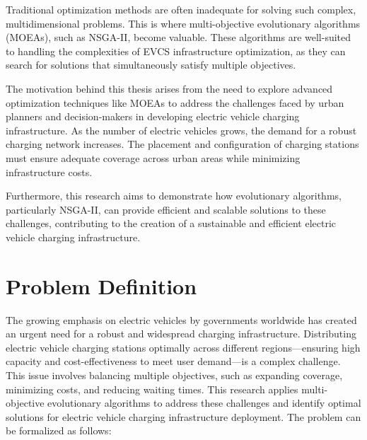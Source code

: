 Traditional optimization methods are often inadequate for solving such complex, multidimensional problems. This is where multi-objective evolutionary algorithms (MOEAs), such as NSGA-II, become valuable. These algorithms are well-suited to handling the complexities of EVCS infrastructure optimization, as they can search for solutions that simultaneously satisfy multiple objectives.

The motivation behind this thesis arises from the need to explore advanced optimization techniques like MOEAs to address the challenges faced by urban planners and decision-makers in developing electric vehicle charging infrastructure. As the number of electric vehicles grows, the demand for a robust charging network increases. The placement and configuration of charging stations must ensure adequate coverage across urban areas while minimizing infrastructure costs.

Furthermore, this research aims to demonstrate how evolutionary algorithms, particularly NSGA-II, can provide efficient and scalable solutions to these challenges, contributing to the creation of a sustainable and efficient electric vehicle charging infrastructure.

\section{Problem Definition}

The growing emphasis on electric vehicles by governments worldwide has created an urgent need for a robust and widespread charging infrastructure. Distributing electric vehicle charging stations optimally across different regions—ensuring high capacity and cost-effectiveness to meet user demand—is a complex challenge. This issue involves balancing multiple objectives, such as expanding coverage, minimizing costs, and reducing waiting times. This research applies multi-objective evolutionary algorithms to address these challenges and identify optimal solutions for electric vehicle charging infrastructure deployment. The problem can be formalized as follows:

